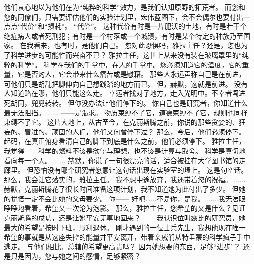 \documentclass[openany]{book}
\begin{document}
\begin{dialogue}
     他们衷心地以为他们在为“纯粹的科学”效力，是我们认知原野的拓荒者。
     而您和您的同僚们，只需要评估他们的实验计划里，宏伟蓝图下，会不会偶尔也要付出一点点“代价”和“损耗”。
     “代价”。
     这种代价有时是一片肥沃的土地，有时是若干个绝症病人或者死刑犯；有时是一个村落或一个城镇，有时是某个特定的种族乃至国家。
     在我看来，也有时，是他们自己。
     您对此恐惧吗，雅拉主任？还是，您也为了科学进步的可能性而兴奋不已？
     雅拉主任，这世上从来没有装在玻璃罩里的“纯粹的科学”。
     科学在我们的手掌中，在人的手掌中。您必须知道它的温度，它的重量，它是否灼人，它会带来什么痛苦或是慰藉。
     那些人永远声称自己是在前进，可他们只是胡乱把脚伸向自己想践踏的地方而已。
     但，赫默，这就是前进。
     没有人知道路在哪，他们只能这么走。
     幸运者找对了地方，走入光明中。不幸者闯进死胡同，兜兜转转。
     但你没办法让他们停下的。
     你自己也是研究者，你知道什么最无法阻挡。
     ......
     ——是渴求。
     物质束缚不了它，道德束缚不了它，规则也同样束缚不了它。
     这片大地上，从古至今，在克丽斯腾之前，你说的那些贪婪的、狂妄的、冒进的、顽固的人们，他们又何曾停下过？
     那么，今后，他们必须停下。
     起码，在真正俯身看清自己的脚下到底是什么之前，他们必须停下。
     雅拉主任，我觉得——科学的燃料不该是欲望与理想，也不该是计算与取舍。
     科学是真切地看向每一个人。
     ......
     赫默，你说了一句很漂亮的话，适合被挂在大学图书馆的走廊里。
     但恐怕没有哪个研究者愿意让这句话出现在实验室的墙上。
     这是句空话。
     那么，我会让它落实的，雅拉主任。
     我不想中途放弃，我还带着您的祝福。
     ......
     赫默，克丽斯腾花了很长时间准备这项计划，我不知道她为此付出了多少。
     但她的觉悟一定不会比她的父母要少。
     你——
     好吧......不是你，是我。
     ......我无法眼睁睁地看着，希望又一次沦为泡影。
     那么，雅拉主任，您希望的又是什么？见证克丽斯腾的成功，还是让她平安无事地回来？
     ......
     我认识位叫露比的研究员，她最大的希望是按时下班，顺利退休。
     刚才遇到的一位士兵先生，我想他现在唯一希望的事就是从这座失控的能量井平安离开，带着亲戚们从特里蒙的科学疯子手中逃走。
     与他们相比，总辖的希望更高贵吗？
     因为她想要的东西，足够“进步”？
     还是只是因为，您与她之间的感情，足够紧密？

\end{dialogue}
\end{document}
